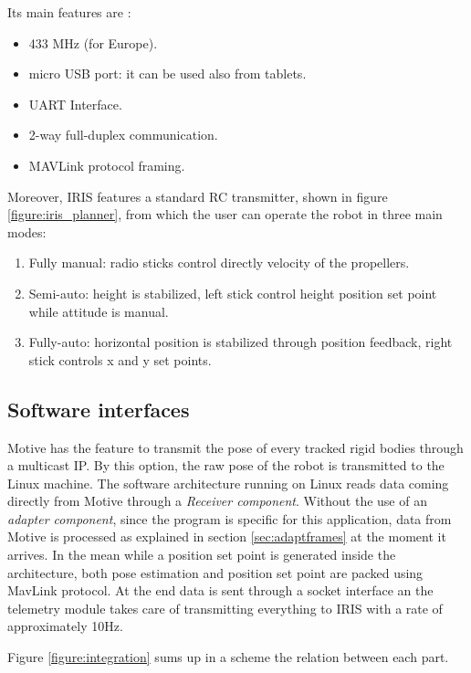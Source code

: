 \noindent
Its main features are \cite{3Dr}:

\begin{itemize}
\item 433 MHz (for Europe).
\item micro USB port: it can be used also from tablets.
\item UART Interface.
\item 2-way full-duplex communication.
\item MAVLink protocol framing.
\end{itemize}
Moreover, IRIS features a standard RC transmitter, shown in figure \ref{figure:iris_planner}, from which the user can operate the robot in three main modes:
\begin{enumerate}
\item Fully manual: radio sticks control directly velocity of the propellers.
\item Semi-auto: height is stabilized, left stick control height position set point while attitude is manual.
\item Fully-auto: horizontal position is stabilized through position feedback, right stick controls x and y set points.
\end{enumerate}

\subsection{Software interfaces}

Motive has the feature to transmit the pose of every tracked rigid bodies through a multicast IP. By this option, the raw pose of the robot is transmitted to the Linux machine. The software architecture running on Linux reads data coming directly from Motive through a \textit{Receiver component}. Without the use of an \textit{adapter component}, since the program is specific for this application, data from Motive is processed as explained in section \ref{sec:adaptframes} at the moment it arrives. In the mean while a position set point is generated inside the architecture, both pose estimation and position set point are packed using MavLink protocol. At the end data is sent through a socket interface an the telemetry module takes care of transmitting everything to IRIS with a rate of approximately 10Hz.

Figure \ref{figure:integration} sums up in a scheme the relation between each part. 

